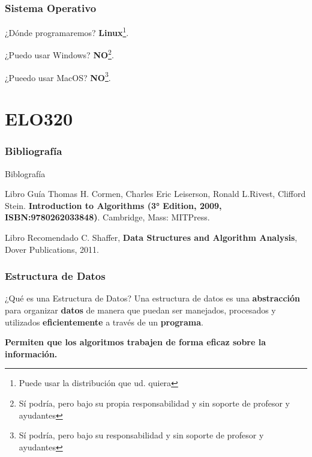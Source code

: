 \documentclass{beamer}
\newcommand{\inputTikZ}[2]{%
	\scalebox{#1}{}
}
\begin{document}
\section{Sistema Operativo}
\begin{frame}{¿Dónde programaremos?}
\Huge \textbf{Linux}\footnote{Puede usar la distribución que ud. quiera}.
\end{frame}

\begin{frame}{¿Puedo usar Windows?}
\Huge \textbf{NO}\footnote{Sí podría, pero bajo su propia responsabilidad y sin soporte de profesor y ayudantes}.
\end{frame}

\begin{frame}{¿Pueedo usar MacOS?}
\Huge \textbf{NO}\footnote{Sí podría, pero bajo su responsabilidad y sin soporte de profesor y ayudantes}.
\end{frame}
\part{ELO320}
\section{Bibliografía}
\begin{frame}{Biblografía}
\begin{alertblock}{Libro Guía}
Thomas H. Cormen, Charles Eric Leiserson, Ronald L.Rivest, Clifford Stein. \textbf{Introduction to Algorithms (3° Edition, 2009, ISBN:9780262033848)}. Cambridge, Mass: MITPress.
\end{alertblock}

\begin{block}{Libro Recomendado}
C. Shaffer, \textbf{Data Structures and Algorithm Analysis}, Dover Publications, 2011. 
\end{block}
\end{frame}

\section{Estructura de Datos}
\begin{frame}{¿Qué es una Estructura de Datos?}
Una estructura de datos es una \textbf{abstracción} para organizar \textbf{datos} de manera que puedan ser manejados, procesados y utilizados \textbf{eficientemente} a través de un \textbf{programa}.

\hspace*{-0.5cm}\inputTikZ{0.7}{images/eda1.tex}

\textbf{Permiten que los algoritmos trabajen de forma eficaz sobre la información.}
\end{frame}
\end{document}
